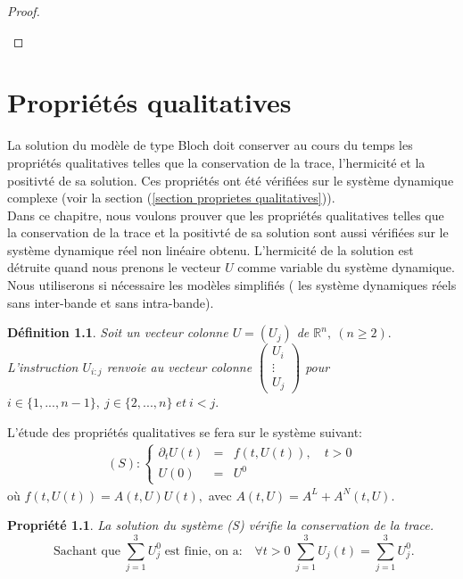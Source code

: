 \documentclass[12pt,a4paper,openany,oneside]{book}
\newtheorem{property}{Propriété}[chapter]
\newtheorem{definition}{Définition}[chapter]
\begin{document}
{{{{{{\begin{proof}
\begin{itemize}[label=$\bullet$]
\end{itemize}


\end{proof}  



\chapter{Propriétés qualitatives}
La solution du modèle de type Bloch  doit conserver au cours du temps les propriétés qualitatives telles que la conservation de la trace, l’hermicité et la positivté de sa solution. Ces propriétés ont été vérifiées sur le système dynamique complexe (voir la section (\ref{section proprietes qualitatives})).\\
Dans ce chapitre, nous voulons prouver que les propriétés qualitatives telles que la conservation de la trace et la positivté de sa solution sont aussi vérifiées sur le système dynamique réel non linéaire obtenu. L’hermicité de la solution est détruite quand nous prenons le vecteur $U$ comme variable du système dynamique.\\
Nous utiliserons si nécessaire les modèles simplifiés ( les système dynamiques réels sans inter-bande et sans intra-bande).\\

\begin{definition}
Soit un vecteur colonne $U=(U_{j})$ de $\mathbb{R}^{n},\: (n\geq 2).$
L'instruction $U_{i:j}$ renvoie au vecteur colonne
$ \begin{pmatrix}
U_{i}\\
\vdots\\
U_{j}
\end{pmatrix}$ 
pour $ i \in \{1,...,n-1\},\: j \in \{2,...,  n\} \; et \: i<j .$

\end{definition}

L'étude des propriétés qualitatives se fera sur le système suivant: 
\begin{eqnarray*}
(S):\left\{\begin{array}{lll}
\partial_{t}U(t) & = & \mbox{$f(t,U(t)),\quad t>0$}\\
U(0) & = & U^{0}
\end{array}\right.
\end{eqnarray*}
où $f(t,U(t))= A(t,U)U(t),$ avec $ A(t,U)= A^{L}+ A^{N}(t,U)$.


\begin{property}
La solution du système (S) vérifie la conservation de la trace.
$$ \textrm{ Sachant que} \; \sum_{j=1}^{3}U_{j}^{0} \;\textrm{est finie, on a:}\quad 
 \forall t> 0 \; \sum_{j=1}^{3}U_{j}(t)= \sum_{j=1}^{3}U_{j}^{0}.$$
\end {property}

}}}}}}
\end{document}
